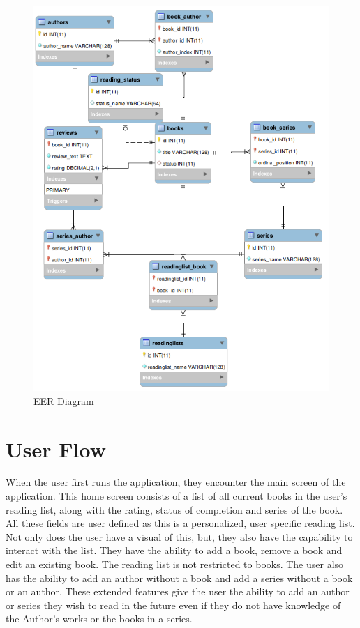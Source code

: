 \documentclass{article}
\begin{document}
\begin{figure}[h]
  \centering
  \includegraphics[width=\textwidth]{eer-diagram}
  \caption{EER Diagram}
\end{figure}

\section*{User Flow}

When the user first runs the application, they encounter the main screen of the
application.  This home screen consists of a list of all current books in the
user's reading list, along with the rating, status of completion and series of
the book. All these fields are user defined as this is a personalized, user
specific reading list. Not only does the user have a visual of this, but, they
also have the capability to interact with the list. They have the ability to add
a book, remove a book and edit an existing book. The reading list is not
restricted to books. The user also has the ability to add an author without a
book and add a series without a book or an author.  These extended features give
the user the ability to add an author or series they wish to read in the future
even if they do not have knowledge of the Author's works or the books in a
series.
\end{document}
